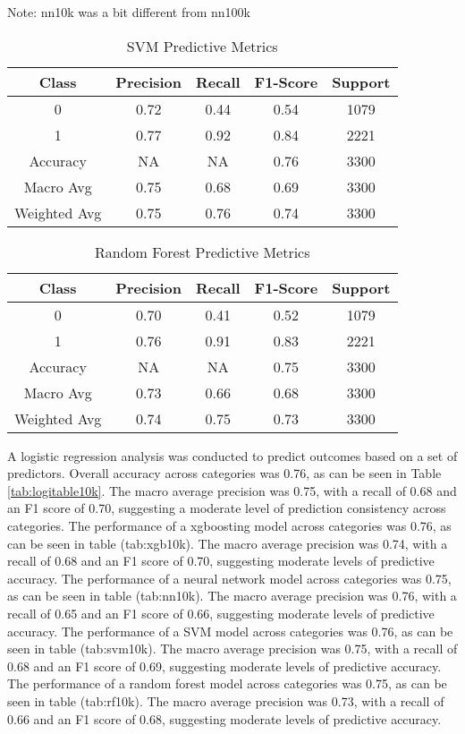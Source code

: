 \documentclass[
  man]{apa7}
\begin{document}
Note: nn10k was a bit different from nn100k

\begin{table}
\centering
\caption{\label{tab:svm10k}SVM Predictive Metrics}
\centering
\fontsize{12}{14}\selectfont
\begin{tabular}[t]{c|c|c|c|c}
\hline
Class & Precision & Recall & F1-Score & Support\\
\hline
0 & 0.72 & 0.44 & 0.54 & 1079\\
\hline
1 & 0.77 & 0.92 & 0.84 & 2221\\
\hline
Accuracy & NA & NA & 0.76 & 3300\\
\hline
Macro Avg & 0.75 & 0.68 & 0.69 & 3300\\
\hline
Weighted Avg & 0.75 & 0.76 & 0.74 & 3300\\
\hline
\end{tabular}
\end{table}

\begin{table}
\centering
\caption{\label{tab:rf10k}Random Forest Predictive Metrics}
\centering
\fontsize{12}{14}\selectfont
\begin{tabular}[t]{c|c|c|c|c}
\hline
Class & Precision & Recall & F1-Score & Support\\
\hline
0 & 0.70 & 0.41 & 0.52 & 1079\\
\hline
1 & 0.76 & 0.91 & 0.83 & 2221\\
\hline
Accuracy & NA & NA & 0.75 & 3300\\
\hline
Macro Avg & 0.73 & 0.66 & 0.68 & 3300\\
\hline
Weighted Avg & 0.74 & 0.75 & 0.73 & 3300\\
\hline
\end{tabular}
\end{table}

A logistic regression analysis was conducted to predict outcomes based on a set of predictors. Overall accuracy across categories was 0.76, as can be seen in Table \ref{tab:logitable10k}. The macro average precision was 0.75, with a recall of 0.68 and an F1 score of 0.70, suggesting a moderate level of prediction consistency across categories.
The performance of a xgboosting model across categories was 0.76, as can be seen in table (tab:xgb10k). The macro average precision was 0.74, with a recall of 0.68 and an F1 score of 0.70, suggesting moderate levels of predictive accuracy.
The performance of a neural network model across categories was 0.75, as can be seen in table (tab:nn10k). The macro average precision was 0.76, with a recall of 0.65 and an F1 score of 0.66, suggesting moderate levels of predictive accuracy.
The performance of a SVM model across categories was 0.76, as can be seen in table (tab:svm10k). The macro average precision was 0.75, with a recall of 0.68 and an F1 score of 0.69, suggesting moderate levels of predictive accuracy.
The performance of a random forest model across categories was 0.75, as can be seen in table (tab:rf10k). The macro average precision was 0.73, with a recall of 0.66 and an F1 score of 0.68, suggesting moderate levels of predictive accuracy.
\end{document}
